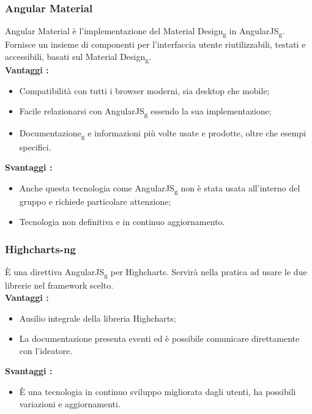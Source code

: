 {{		\subsubsection{Angular Material}{
			Angular Material è l’implementazione del Material Design\textsubscript{g} in AngularJS\textsubscript{g}. Fornisce un insieme di componenti per l’interfaccia utente riutilizzabili, testati e accessibili, basati sul Material Design\textsubscript{g}. \\
			\textbf{Vantaggi :}
			\begin{itemize}\itemsep1pt
				\item Compatibilità con tutti i browser moderni, sia desktop che mobile;
				\item Facile relazionarsi con AngularJS\textsubscript{g} essendo la sua implementazione;
				\item Documentazione\textsubscript{g} e informazioni più volte usate e prodotte, oltre che esempi specifici.
			\end{itemize}
			\textbf{Svantaggi :}
			\begin{itemize}\itemsep1pt
				\item Anche questa tecnologia come AngularJS\textsubscript{g} non è stata usata all'interno del gruppo e richiede particolare attenzione;
				\item Tecnologia non definitiva e in continuo aggiornamento.
			\end{itemize}
		}
		\subsubsection{Highcharts-ng}{
			È una direttiva AngularJS\textsubscript{g} per Highcharts. Servirà nella pratica ad usare le due librerie nel framework scelto.\\
			\textbf{Vantaggi :}
			\begin{itemize}\itemsep1pt
				\item Ausilio integrale della libreria Highcharts;
				\item La documentazione presenta eventi ed è possibile comunicare direttamente con l'ideatore.
			\end{itemize}
			\textbf{Svantaggi :}
			\begin{itemize}\itemsep1pt
				\item È una tecnologia in continuo sviluppo migliorata dagli utenti, ha possibili variazioni e aggiornamenti.
			\end{itemize}
		}
	}
}